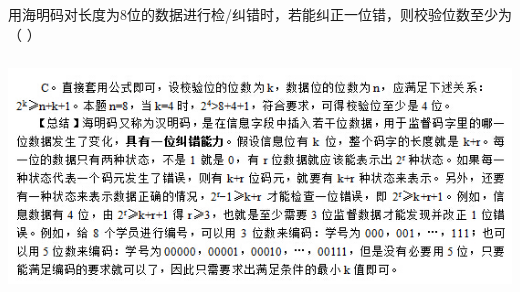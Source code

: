 \question 用海明码对长度为8位的数据进行检/纠错时，若能纠正一位错，则校验位数至少为（
）
\par{}
\begin{solution}\includegraphics[width=5.75000in,height=2.45833in]{computerassets/6dab0b87ce9771114c3afd68fd5693cb.jpeg}
\end{solution}
